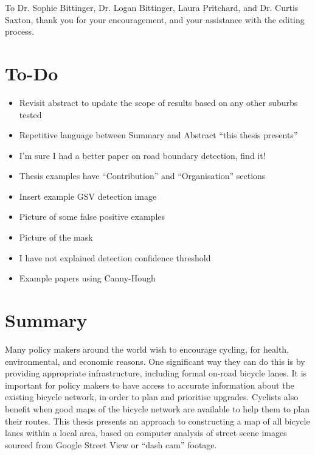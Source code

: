 \documentclass[11pt,twoside]{report}
\begin{document}
To Dr. Sophie Bittinger, Dr. Logan Bittinger, Laura Pritchard, and Dr. Curtis Saxton, thank you for your encouragement, and your assistance with the editing process.



\chapter*{To-Do}

\begin{itemize}
\item{Revisit abstract to update the scope of results based on any other suburbs tested}
\item{Repetitive language between Summary and Abstract ``this thesis presents''}
\item{I'm sure I had a better paper on road boundary detection, find it!}
\item{Thesis examples have ``Contribution'' and ``Organisation'' sections}
\item{Insert example GSV detection image}
\item{Picture of some false positive examples}
\item{Picture of the mask}
\item{I have not explained detection confidence threshold}
\item{Example papers using Canny-Hough}
\end{itemize}

\chapter*{Summary}

Many policy makers around the world wish to encourage cycling, for health, environmental, and economic reasons.  One significant way they can do this is by providing appropriate infrastructure, including formal on-road bicycle lanes.  It is important for policy makers to have access to accurate information about the existing bicycle network, in order to plan and prioritise upgrades.  Cyclists also benefit when good maps of the bicycle network are available to help them to plan their routes.  This thesis presents an approach to constructing a map of all bicycle lanes within a local area, based on computer analysis of street scene  images sourced from Google Street View or ``dash cam'' footage.
\end{document}
